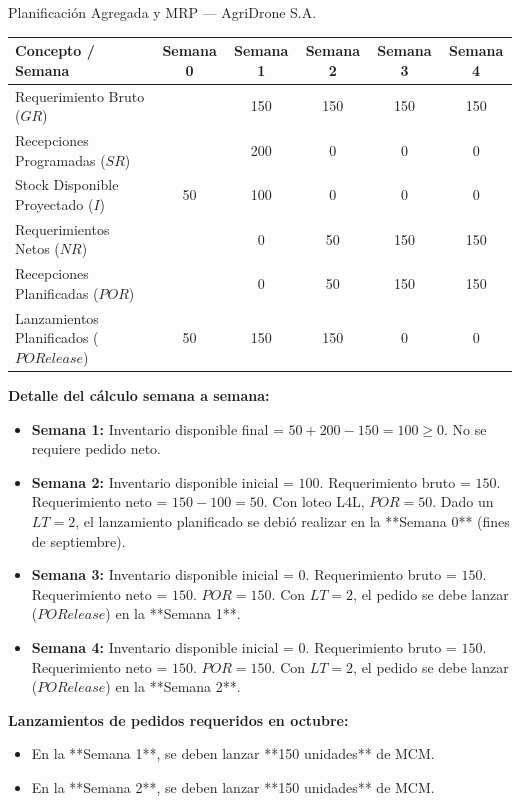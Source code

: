 \documentclass[11pt, a4paper]{article}
\begin{document}
\begin{ejercicio}{Planificación Agregada y MRP --- AgriDrone S.A.}
  \begin{center}
    \small
    \begin{tabular}{lccccc}
      \toprule
      \textbf{Concepto / Semana} & \textbf{Semana 0} & \textbf{Semana 1} & \textbf{Semana 2} & \textbf{Semana 3} & \textbf{Semana 4} \\
      \midrule
      Requerimiento Bruto ($GR$) & & 150 & 150 & 150 & 150 \\
      Recepciones Programadas ($SR$) & & 200 & 0 & 0 & 0 \\
      Stock Disponible Proyectado ($I$) & 50 & 100 & 0 & 0 & 0 \\
      Requerimientos Netos ($NR$) & & 0 & 50 & 150 & 150 \\
      Recepciones Planificadas ($POR$) & & 0 & 50 & 150 & 150 \\
      Lanzamientos Planificados ($PORelease$) & 50 & 150 & 150 & 0 & 0 \\
      \bottomrule
    \end{tabular}
  \end{center}

  \textbf{Detalle del cálculo semana a semana:}
  \begin{itemize}
    \item \textbf{Semana 1:} Inventario disponible final = $50 + 200 - 150 = 100 \ge 0$. No se requiere pedido neto.
    \item \textbf{Semana 2:} Inventario disponible inicial = $100$. Requerimiento bruto = $150$. Requerimiento neto = $150 - 100 = 50$. Con loteo L4L, $POR = 50$. Dado un $LT=2$, el lanzamiento planificado se debió realizar en la **Semana 0** (fines de septiembre).
    \item \textbf{Semana 3:} Inventario disponible inicial = $0$. Requerimiento bruto = $150$. Requerimiento neto = $150$. $POR = 150$. Con $LT=2$, el pedido se debe lanzar ($PORelease$) en la **Semana 1**.
    \item \textbf{Semana 4:} Inventario disponible inicial = $0$. Requerimiento bruto = $150$. Requerimiento neto = $150$. $POR = 150$. Con $LT=2$, el pedido se debe lanzar ($PORelease$) en la **Semana 2**.
  \end{itemize}

  \textbf{Lanzamientos de pedidos requeridos en octubre:}
  \begin{itemize}
    \item En la **Semana 1**, se deben lanzar **150 unidades** de MCM.
    \item En la **Semana 2**, se deben lanzar **150 unidades** de MCM.
  \end{itemize}


\end{ejercicio}
\end{document}

